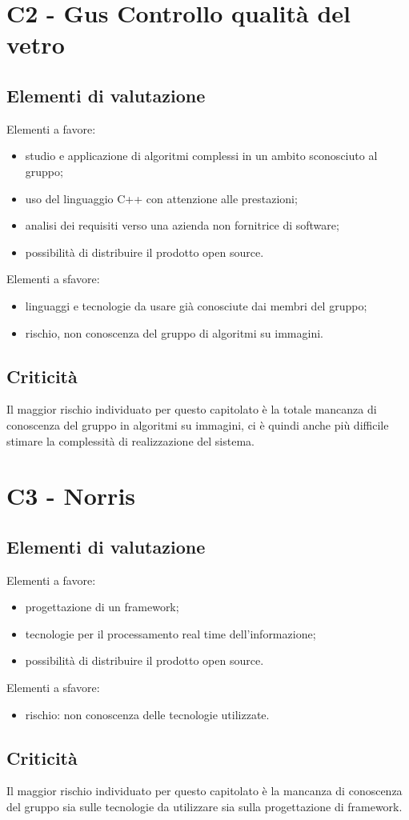 \section{C2 - Gus Controllo qualità del vetro}{
	\subsection{Elementi di valutazione}{
		Elementi a favore:
		\begin{itemize}
			\item studio e applicazione di algoritmi complessi in un ambito sconosciuto al gruppo;
			\item uso del linguaggio C++ con attenzione alle prestazioni;
			\item analisi dei requisiti verso una azienda non fornitrice di software;
			\item possibilità di distribuire il prodotto open source.
		\end{itemize}
		
		Elementi a sfavore:
		\begin{itemize}
			\item linguaggi e tecnologie da usare già conosciute dai membri del gruppo;
			\item rischio, non conoscenza del gruppo di algoritmi su immagini.
		\end{itemize}
	}
	\subsection{Criticità}{
		Il maggior rischio individuato per questo capitolato è la totale mancanza di conoscenza del gruppo in algoritmi su immagini, ci è quindi anche più difficile stimare la complessità di realizzazione del sistema.
	}
}
\section{C3 - Norris}{
	\subsection{Elementi di valutazione}{
		Elementi a favore:
		\begin{itemize}
			\item progettazione di un framework;
			\item tecnologie per il processamento real time dell'informazione;
			\item possibilità di distribuire il prodotto open source.
		\end{itemize}
		
		Elementi a sfavore:
		\begin{itemize}
			\item rischio: non conoscenza delle tecnologie utilizzate.
		\end{itemize}
	}
	\subsection{Criticità}{
		Il maggior rischio individuato per questo capitolato è la mancanza di conoscenza del gruppo sia sulle tecnologie da utilizzare sia sulla progettazione di framework.
	}
}
